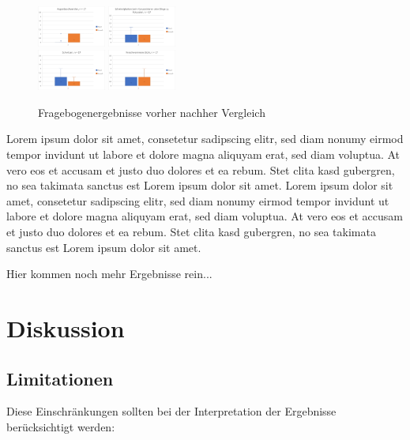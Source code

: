 \documentclass[conference]{IEEEtran}
\begin{document}
\begin{figure}[ht]
	\centering
	\includegraphics[width=0.2\textwidth]{assets/augenBesch.png} \hspace{-5pt}
	\includegraphics[width=0.2\textwidth]{assets/fokus.png} \\
	\vspace{2pt}
	\includegraphics[width=0.2\textwidth]{assets/schwitz.png} \hspace{-5pt}
	\includegraphics[width=0.2\textwidth]{assets/verschwSicht.png}
	\caption{Fragebogenergebnisse vorher nachher Vergleich}
	\label{fig:Fragebogenergebnisse}
\end{figure}
Lorem ipsum dolor sit amet, consetetur sadipscing elitr, sed diam nonumy eirmod tempor invidunt ut labore et dolore magna aliquyam erat, sed diam voluptua. At vero eos et accusam et justo duo dolores et ea rebum. Stet clita kasd gubergren, no sea takimata sanctus est Lorem ipsum dolor sit amet. Lorem ipsum dolor sit amet, consetetur sadipscing elitr, sed diam nonumy eirmod tempor invidunt ut labore et dolore magna aliquyam erat, sed diam voluptua. At vero eos et accusam et justo duo dolores et ea rebum. Stet clita kasd gubergren, no sea takimata sanctus est Lorem ipsum dolor sit amet.

Hier kommen noch mehr Ergebnisse rein...

\section{Diskussion}
\subsection{Limitationen}
Diese Einschränkungen sollten bei der Interpretation der Ergebnisse berücksichtigt werden:
\end{document}
